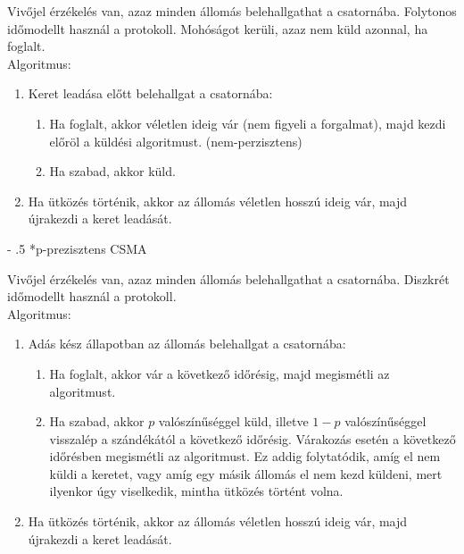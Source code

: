 \documentclass[12pt]{article}
\makeatletter
\renewcommand\paragraph{%
	\@startsection{paragraph}{4}{0mm}%
	{-\baselineskip}%
	{.5\baselineskip}%
	{\normalfont\normalsize\bfseries}}
\makeatother
\begin{document}
    Vivőjel érzékelés van, azaz minden állomás belehallgathat a csatornába. Folytonos időmodellt használ a protokoll. Mohóságot kerüli, azaz nem küld azonnal, ha foglalt.\\

    \noindent Algoritmus:
    \begin{enumerate}	
    	\item Keret leadása előtt belehallgat a csatornába:
    	\begin{enumerate}
                \item Ha foglalt, akkor véletlen ideig vár (nem figyeli a forgalmat), majd kezdi előröl a küldési algoritmust. (nem-perzisztens)
                \item Ha szabad, akkor küld.
    	\end{enumerate}
    	\item Ha ütközés történik, akkor az állomás véletlen hosszú ideig vár, majd újrakezdi a keret leadását.
    \end{enumerate}

    \paragraph*{p-prezisztens CSMA}

    Vivőjel érzékelés van, azaz minden állomás belehallgathat a csatornába. Diszkrét időmodellt használ a protokoll.\\

    \noindent Algoritmus:
    \begin{enumerate}	
    	\item Adás kész állapotban az állomás belehallgat a csatornába:
    	\begin{enumerate}
                \item Ha foglalt, akkor vár a következő időrésig, majd megismétli az algoritmust.
                \item Ha szabad, akkor $p$ valószínűséggel küld, illetve $1-p$ valószínűséggel visszalép a szándékától a következő időrésig. Várakozás esetén a következő időrésben megismétli az algoritmust. Ez addig folytatódik, amíg el nem küldi a keretet, vagy amíg egy másik állomás el nem kezd küldeni, mert ilyenkor úgy viselkedik, mintha ütközés történt volna.
    	\end{enumerate}
    	\item Ha ütközés történik, akkor az állomás véletlen hosszú ideig vár, majd újrakezdi a keret leadását.
    \end{enumerate}
\end{document}
